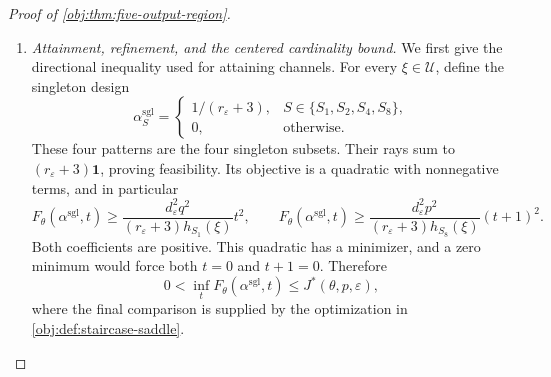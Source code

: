 \documentclass[11pt]{article}
\begin{document}
\begin{proof}[Proof of \cref{obj:thm:five-output-region}]
\begin{enumerate}
The row constraints already show that
\[
\beta_{S_3}=\beta_{S_4}=\beta_{S_8}
=\frac{1-4\beta_{S_6}}5,
\qquad
\beta_{S_9}=\beta_{S_6}.
\]
To solve the remaining stationarity equation, define its reduced
coefficient
\[
C_{\mathrm{cen}}
=
10s_{\mathrm{cen}}p^2+5s_{\mathrm{cen}}p
-5s_{\mathrm{cen}}-8p^2.
\]
Substitute these row coordinates into the displayed derivative formula,
use \(t_{\mathrm{cen}}=(p-s_{\mathrm{cen}})/D_{\mathrm{cen}}\), and clear
the positive denominators. The resulting equation is
\[
(p-1)\bigl(C_{\mathrm{cen}}\beta_{S_6}+2p^2\bigr)=0.
\]
Since \(p<1/2\), it follows that
\[
C_{\mathrm{cen}}\beta_{S_6}=-2p^2.
\]
The square identity for \(s_{\mathrm{cen}}\) further gives
\[
\begin{aligned}
C_{\mathrm{cen}}s_{\mathrm{cen}}
&=5(2p-1)(1+p)s_{\mathrm{cen}}^2-8p^2s_{\mathrm{cen}}\\
&=-8p^2D_{\mathrm{cen}}<0.
\end{aligned}
\]
Thus \(C_{\mathrm{cen}}\ne0\), and
\[
C_{\mathrm{cen}}\bigl(4D_{\mathrm{cen}}\beta_{S_6}\bigr)
=
-8p^2D_{\mathrm{cen}}
=
C_{\mathrm{cen}}s_{\mathrm{cen}}.
\]
Cancellation proves
\[
\beta_{S_6}=\frac{s_{\mathrm{cen}}}{4D_{\mathrm{cen}}}
=\alpha_{\mathrm{cen},S_6}.
\]
The row-coordinate identities determine the other four active weights,
and both vectors vanish elsewhere. Hence
\[
\beta=\alpha_{\mathrm{cen}},
\]
proving the centered uniqueness assertion.

\item \textit{Attainment, refinement, and the centered cardinality bound.}
We first give the directional inequality used for attaining channels.
For every \(\xi\in\mathcal U\), define the singleton design
\[
\alpha^{\mathrm{sgl}}_S=
\begin{cases}
1/(r_\varepsilon+3),&S\in\{S_1,S_2,S_4,S_8\},\\
0,&\text{otherwise}.
\end{cases}
\]
These four patterns are the four singleton subsets. Their rays sum to
\((r_\varepsilon+3)\mathbf1\), proving feasibility. Its objective is a
quadratic with nonnegative terms, and in particular
\[
F_\theta(\alpha^{\mathrm{sgl}},t)
\ge
\frac{d_\varepsilon^2q^2}
     {(r_\varepsilon+3)h_{S_1}(\xi)}t^2,
\qquad
F_\theta(\alpha^{\mathrm{sgl}},t)
\ge
\frac{d_\varepsilon^2p^2}
     {(r_\varepsilon+3)h_{S_8}(\xi)}(t+1)^2.
\]
Both coefficients are positive. This quadratic has a minimizer, and a
zero minimum would force both \(t=0\) and \(t+1=0\). Therefore
\[
0<\inf_tF_\theta(\alpha^{\mathrm{sgl}},t)
\le J^*(\theta,p,\varepsilon),
\]
where the final comparison is supplied by the optimization in
\cref{obj:def:staircase-saddle}.


\end{enumerate}
\end{proof}
\end{document}
